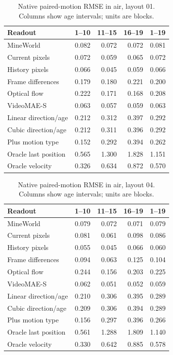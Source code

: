 \begin{table}[!htbp]
\centering\small
\caption{Native paired-motion RMSE in air, layout 01. Columns show age intervals; units are blocks.}
\label{tab:motion-L0-layout_01}
\begin{tabular}{@{}lrrrr@{}}
\toprule
Readout & 1--10 & 11--15 & 16--19 & 1--19\\
\midrule
MineWorld & 0.082 & 0.072 & 0.072 & 0.081\\
Current pixels & 0.072 & 0.059 & 0.065 & 0.072\\
History pixels & 0.066 & 0.045 & 0.059 & 0.066\\
Frame differences & 0.179 & 0.180 & 0.221 & 0.200\\
Optical flow & 0.222 & 0.171 & 0.168 & 0.208\\
VideoMAE-S & 0.063 & 0.057 & 0.059 & 0.063\\
Linear direction/age & 0.212 & 0.312 & 0.397 & 0.292\\
Cubic direction/age & 0.212 & 0.311 & 0.396 & 0.292\\
Plus motion type & 0.152 & 0.292 & 0.394 & 0.262\\
Oracle last position & 0.565 & 1.300 & 1.828 & 1.151\\
Oracle velocity & 0.326 & 0.634 & 0.872 & 0.570\\
\bottomrule
\end{tabular}
\end{table}

\begin{table}[!htbp]
\centering\small
\caption{Native paired-motion RMSE in air, layout 04. Columns show age intervals; units are blocks.}
\label{tab:motion-L0-layout_04}
\begin{tabular}{@{}lrrrr@{}}
\toprule
Readout & 1--10 & 11--15 & 16--19 & 1--19\\
\midrule
MineWorld & 0.079 & 0.072 & 0.071 & 0.079\\
Current pixels & 0.081 & 0.061 & 0.098 & 0.086\\
History pixels & 0.055 & 0.045 & 0.066 & 0.060\\
Frame differences & 0.094 & 0.063 & 0.125 & 0.104\\
Optical flow & 0.244 & 0.156 & 0.203 & 0.225\\
VideoMAE-S & 0.062 & 0.051 & 0.052 & 0.059\\
Linear direction/age & 0.210 & 0.306 & 0.395 & 0.289\\
Cubic direction/age & 0.209 & 0.306 & 0.394 & 0.289\\
Plus motion type & 0.156 & 0.297 & 0.396 & 0.266\\
Oracle last position & 0.561 & 1.288 & 1.809 & 1.140\\
Oracle velocity & 0.330 & 0.642 & 0.885 & 0.578\\
\bottomrule
\end{tabular}
\end{table}

